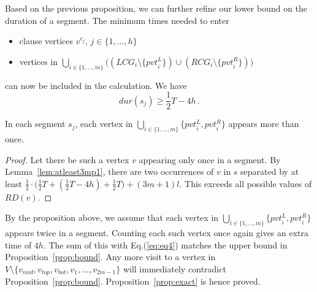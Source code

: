 \documentclass[envcountsame]{llncs}
\begin{document}
Based on the previous proposition, we can further refine our lower bound on the duration of a segment.
The minimum times needed to enter
\begin{itemize}
\item clause vertices $v^{c_j}$, $j \in \{1, \ldots, h\}$
\item vertices in \( \bigcup_{i \in \{1, \ldots, m\}} \big( (\mathit{LCG}_i \setminus \{\mathit{pvt}_i^L\}) \cup (\mathit{RCG}_i \setminus \{ \mathit{pvt}_i^R \} ) \big) \)
\end{itemize}
can now be included in the calculation. We have
\begin{equation}\label{eq:eq4}
\mathit{dur}(s_j) \geq \frac{1}{2}T - 4h \,.
\end{equation}
\begin{proposition}\label{prop:pivotmoreonce}
In each segment $s_j$, each vertex in \( \bigcup_{i \in \{1, \ldots, m\}} \{\mathit{pvt}_i^L, \mathit{pvt}_i^R\} \) appears more than once.
\end{proposition}
\begin{proof}
Let there be such a vertex $v$ appearing only once in a segment.
By Lemma~\ref{lem:atleast3mp1}, there are two occurrences of $v$ in $s$ separated by at least
$\frac{1}{2} \cdot \big( \frac{1}{2}T + (\frac{1}{2}T - 4h) + \frac{1}{2}T \big) + (3m+1)l$.
This exceeds all possible values of $\mathit{RD}(v)$.
\end{proof}

By the proposition above, we assume that each vertex in \( \bigcup_{i \in \{1, \ldots, m\}} \{\mathit{pvt}_i^L, \mathit{pvt}_i^R\} \) appears twice in a segment.
Counting each such vertex once again gives an extra time of $4h$. The sum of this with Eq.(\ref{eq:eq4})
matches the upper bound in Proposition~\ref{prop:bound}.
Any more visit to a vertex in $V \setminus \{ v_{mid}, v_{top}, v_{bot}, v_1, \ldots, v_{2m-1} \}$
will immediately contradict Proposition~\ref{prop:bound}. Proposition~\ref{prop:exact} is hence proved.
\end{document}
